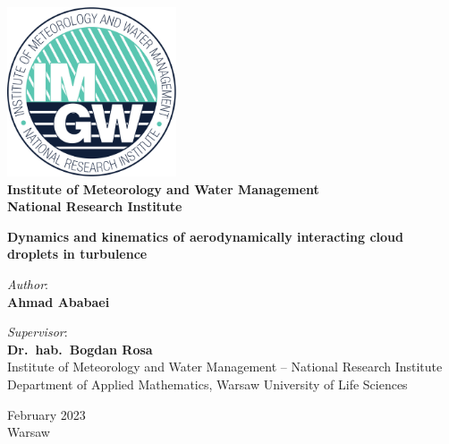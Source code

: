 \documentclass[../thesis.tex]{subfiles}
\begin{document}
\begin{titlepage}
\centering
\includegraphics[width=5cm]{figs/IMGW-PIB_LOGO.pdf}
\\ 
\large\textbf{Institute of Meteorology and Water Management
\\National Research Institute} \\

\vspace{2cm}

\LARGE{\textbf{Dynamics and kinematics of aerodynamically interacting cloud droplets in turbulence}} \\

\vspace{2cm}

\normalsize{\textit{Author}:} \\
{\textbf{Ahmad Ababaei}} \\

\vspace{2cm}

\normalsize{\textit{Supervisor}: \\
\textbf{Dr.\ hab.\ Bogdan Rosa} \\
Institute of Meteorology and Water Management -- National Research Institute} \\
Department of Applied Mathematics, Warsaw University of Life Sciences \\

\vfill

\normalsize{February 2023\\Warsaw}

\end{titlepage}
\newpage
\end{document}
